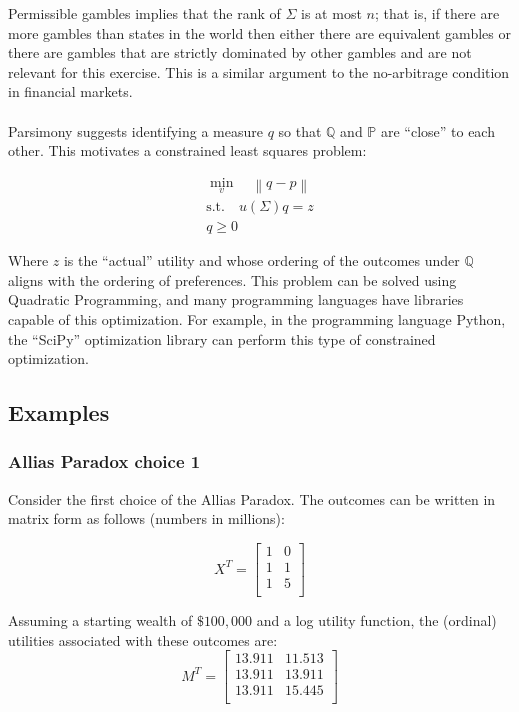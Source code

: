 \documentclass{article}
\newcommand{\norm}[1]{\left\lVert#1\right\rVert}
\begin{document}
Permissible gambles implies that the rank of \(\Sigma\) is at most \(n\); that is, if there are more gambles than states in the world then either there are equivalent gambles or there are gambles that are strictly dominated by other gambles and are not relevant for this exercise.  This is a similar argument to the no-arbitrage condition in financial markets.  
\\
\\
Parsimony suggests identifying a measure \(q\) so that \(\mathbb{Q}\) and \(\mathbb{P}\) are ``close'' to each other.  This motivates a constrained least squares problem:

\begin{equation}
\begin{aligned}
\min_v \quad \norm{q-p} \\
\textrm{s.t.}\quad u(\Sigma) q = z\\
q \geq 0
\end{aligned}
\end{equation}

Where \(z\) is the ``actual'' utility and whose ordering of the outcomes under \(\mathbb{Q}\) aligns with the ordering of preferences.  This problem can be solved using Quadratic Programming, and many programming languages have libraries capable of this optimization. For example, in the programming language Python, the ``SciPy'' optimization library can perform this type of constrained optimization.

\subsection{Examples}

\subsubsection{Allias Paradox choice 1}
Consider the first choice of the Allias Paradox.  The outcomes can be written in matrix form as follows (numbers in millions):

\[X^T=\begin{bmatrix}
	1 & 0  \\
	1 & 1  \\
	1 & 5  \\
\end{bmatrix}\]

Assuming a starting wealth of \(\$100,000\) and a log utility function, the (ordinal) utilities associated with these outcomes are:
\[M^T=\begin{bmatrix}
	13.911 & 11.513  \\
	13.911 & 13.911  \\
	13.911 & 15.445  \\
\end{bmatrix}\]
\end{document}

